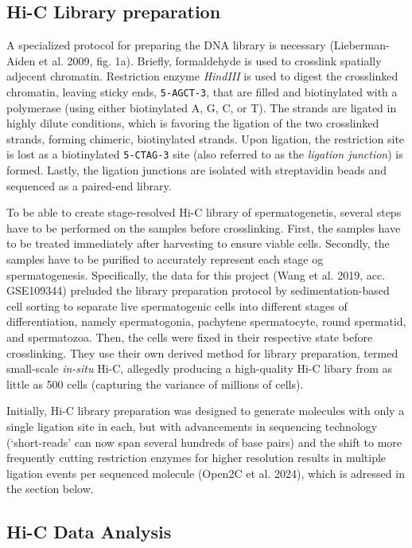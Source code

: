 \documentclass[
  11pt,
  a4paper,
]{scrbook}
\let\oldemph\emph
\renewcommand\emph[1]{\oldemph{\color{gray}#1}}
\begin{document}
\subsection{Hi-C Library preparation}\label{hi-c-library-preparation}

A specialized protocol for preparing the DNA library is necessary
(Lieberman-Aiden et al. 2009, fig. 1a). Briefly, formaldehyde is used to
crosslink spatially adjecent chromatin. Restriction enzyme
\emph{HindIII} is used to digest the crosslinked chromatin, leaving
sticky ends, \texttt{5-AGCT-3}, that are filled and biotinylated with a
polymerase (using either biotinylated A, G, C, or T). The strands are
ligated in highly dilute conditions, which is favoring the ligation of
the two crosslinked strands, forming chimeric, biotinylated strands.
Upon ligation, the restriction site is lost as a biotinylated
\texttt{5-CTAG-3} site (also referred to as the \emph{ligation
junction}) is formed. Lastly, the ligation junctions are isolated with
streptavidin beads and sequenced as a paired-end library.

To be able to create stage-resolved Hi-C library of spermatogenetis,
several steps have to be performed on the samples before crosslinking.
First, the samples have to be treated immediately after harvesting to
ensure viable cells. Secondly, the samples have to be purified to
accurately represent each stage og spermatogenesis. Specifically, the
data for this project (Wang et al. 2019, acc. GSE109344) preluded the
library preparation protocol by sedimentation-based cell sorting to
separate live spermatogenic cells into different stages of
differentiation, namely spermatogonia, pachytene spermatocyte, round
spermatid, and spermatozoa. Then, the cells were fixed in their
respective state before crosslinking. They use their own derived method
for library preparation, termed small-scale \emph{in-situ} Hi-C,
allegedly producing a high-quality Hi-C libary from as little as 500
cells (capturing the variance of millions of cells).

Initially, Hi-C library preparation was designed to generate molecules
with only a single ligation site in each, but with advancements in
sequencing technology (`short-reads' can now span several hundreds of
base pairs) and the shift to more frequently cutting restriction enzymes
for higher resolution results in multiple ligation events per sequenced
molecule (Open2C et al. 2024), which is adressed in the section below.

\subsection{Hi-C Data Analysis}\label{hi-c-data-analysis}
\end{document}
